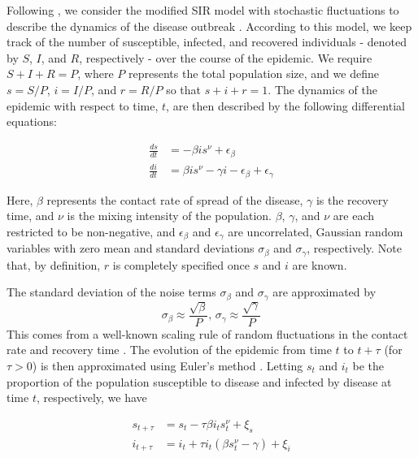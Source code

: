 \documentclass{elsarticle}
\begin{document}
Following \citet{skvortsov2012monitoring}, we consider the modified SIR model with stochastic fluctuations to describe the dynamics of the disease outbreak \citep{herwaarden1995stochepid, dangerfield2009stochepid, anderson2004sars}.  According to this model, we keep track of the number of susceptible, infected, and recovered individuals - denoted by $S$, $I$, and $R$, respectively - over the course of the epidemic.  We require $S + I + R = P$, where $P$ represents the total population size, and we define $s = S/P$, $i = I/P$, and $r = R/P$ so that $s + i + r = 1$.  The dynamics of the epidemic with respect to time, $t$, are then described by the following differential equations:

\begin{align}
\frac{ds}{dt} &= -\beta is^\nu + \epsilon_\beta \label{eqn:dsdt} \\
\frac{di}{dt} &= \beta is^\nu - \gamma i - \epsilon_\beta + \epsilon_\gamma \label{eqn:didt}
\end{align}

\noindent Here, $\beta$ represents the contact rate of spread of the disease, $\gamma$ is the recovery time, and $\nu$ is the mixing intensity of the population.  $\beta$, $\gamma$, and $\nu$ are each restricted to be non-negative, and $\epsilon_\beta$ and $\epsilon_\gamma$ are uncorrelated, Gaussian random variables with zero mean and standard deviations $\sigma_\beta$ and $\sigma_\gamma$, respectively.  Note that, by definition, $r$ is completely specified once $s$ and $i$ are known.

The standard deviation of the noise terms $\sigma_\beta$ and $\sigma_\gamma$ are approximated by
\[\sigma_\beta \approx \frac{\sqrt{\beta}}{P} \mbox{, } \sigma_\gamma \approx \frac{\sqrt{\gamma}}{P}\]
This comes from a well-known scaling rule of random fluctuations in the contact rate and recovery time \citep{ovaskainen2010extinction, herwaarden1995stochepid, dangerfield2009stochepid}.  The evolution of the epidemic from time $t$ to $t + \tau$ (for $\tau > 0$) is then approximated using Euler's method \citep{atkinson1989numericalanalysis}.  Letting $s_t$ and $i_t$ be the proportion of the population susceptible to disease and infected by disease at time $t$, respectively, we have

\begin{align}
s_{t+\tau} &= s_t - \tau\beta i_ts^\nu_t + \xi_s \label{eqn:s} \\
i_{t+\tau} &= i_t + \tau i_t(\beta s^\nu_t - \gamma) + \xi_i \label{eqn:i}
\end{align}
\end{document}
